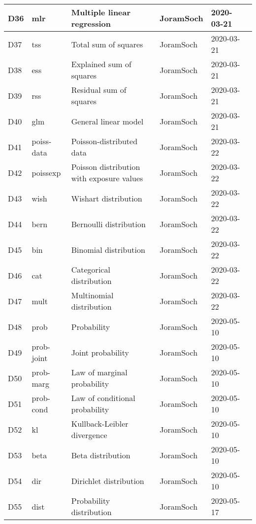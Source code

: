 \documentclass[a4paper,12pt,twoside]{book}
\begin{document}
\begin{longtable}{|p{1cm}|p{2cm}|p{6.5cm}|p{3cm}|p{2cm}|c|}
D36 & mlr & Multiple linear regression & JoramSoch & 2020-03-21 & \pageref{sec:mlr} \\ \hline
D37 & tss & Total sum of squares & JoramSoch & 2020-03-21 & \pageref{sec:tss} \\ \hline
D38 & ess & Explained sum of squares & JoramSoch & 2020-03-21 & \pageref{sec:ess} \\ \hline
D39 & rss & Residual sum of squares & JoramSoch & 2020-03-21 & \pageref{sec:rss} \\ \hline
D40 & glm & General linear model & JoramSoch & 2020-03-21 & \pageref{sec:glm} \\ \hline
D41 & poiss-data & Poisson-distributed data & JoramSoch & 2020-03-22 & \pageref{sec:poiss-data} \\ \hline
D42 & poissexp & Poisson distribution with exposure values & JoramSoch & 2020-03-22 & \pageref{sec:poissexp} \\ \hline
D43 & wish & Wishart distribution & JoramSoch & 2020-03-22 & \pageref{sec:wish} \\ \hline
D44 & bern & Bernoulli distribution & JoramSoch & 2020-03-22 & \pageref{sec:bern} \\ \hline
D45 & bin & Binomial distribution & JoramSoch & 2020-03-22 & \pageref{sec:bin} \\ \hline
D46 & cat & Categorical distribution & JoramSoch & 2020-03-22 & \pageref{sec:cat} \\ \hline
D47 & mult & Multinomial distribution & JoramSoch & 2020-03-22 & \pageref{sec:mult} \\ \hline
D48 & prob & Probability & JoramSoch & 2020-05-10 & \pageref{sec:prob} \\ \hline
D49 & prob-joint & Joint probability & JoramSoch & 2020-05-10 & \pageref{sec:prob-joint} \\ \hline
D50 & prob-marg & Law of marginal probability & JoramSoch & 2020-05-10 & \pageref{sec:prob-marg} \\ \hline
D51 & prob-cond & Law of conditional probability & JoramSoch & 2020-05-10 & \pageref{sec:prob-cond} \\ \hline
D52 & kl & Kullback-Leibler divergence & JoramSoch & 2020-05-10 & \pageref{sec:kl} \\ \hline
D53 & beta & Beta distribution & JoramSoch & 2020-05-10 & \pageref{sec:beta} \\ \hline
D54 & dir & Dirichlet distribution & JoramSoch & 2020-05-10 & \pageref{sec:dir} \\ \hline
D55 & dist & Probability distribution & JoramSoch & 2020-05-17 & \pageref{sec:dist} \\ \hline

\end{longtable}
\end{document}
